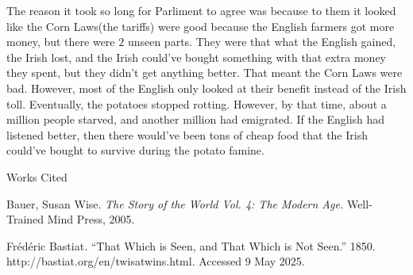 \documentclass[12pt]{article}
\newcommand{\bibent}{\noindent \hangindent 40pt}
\newenvironment{workscited}{\newpage \begin{center} Works Cited \end{center}}{\newpage }
\begin{document}
\begin{flushleft}
The reason it took so long for Parliment to agree was because to them
it looked like the Corn Laws(the tariffs) were good because the
English farmers got more money, but there were $2$ unseen parts. They
were that what the English gained, the Irish lost, and the Irish
could've bought something with that extra money they spent, but they
didn't get anything better. That meant the Corn Laws were
bad. However, most of the English only looked at their benefit instead
of the Irish toll.  Eventually, the potatoes stopped rotting. However,
by that time, about a million people starved, and another million had
emigrated. If the English had listened better, then there would've
been tons of cheap food that the Irish could've bought to survive
during the potato famine.
\begin{workscited}

\bibent
Bauer, Susan Wise. \textit{The Story of the World Vol. 4: The Modern Age.} Well-Trained Mind Press, 2005.

\bibent
Frédéric Bastiat. ``That Which is Seen, and That Which is Not Seen.'' 1850. http://bastiat.org/en/twisatwins.html. Accessed 9 May 2025.



\end{workscited}

\end{flushleft}
\end{document}
